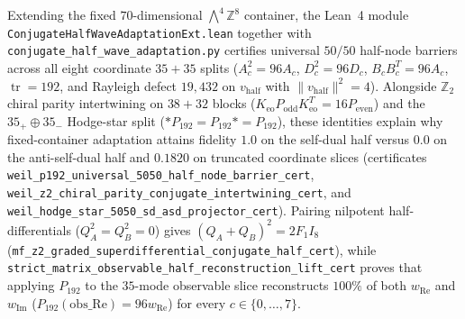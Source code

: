 \documentclass[11pt,a4paper]{article}
\begin{document}
Extending the fixed $70$-dimensional $\bigwedge^4 \mathbb{Z}^8$ container, the Lean~4 module {\small\texttt{Conjugate\allowbreak{}Half\allowbreak{}Wave\allowbreak{}Adaptation\allowbreak{}Ext.lean}} together with {\small\texttt{conjugate\_\allowbreak{}half\_\allowbreak{}wave\_\allowbreak{}adaptation.py}} certifies universal $50/50$ half-node barriers across all eight coordinate $35{+}35$ splits ($A_c^2 = 96 A_c$, $D_c^2 = 96 D_c$, $B_c B_c^T = 96 A_c$, $\operatorname{tr} = 192$, and Rayleigh defect $19{,}432$ on $v_{\mathrm{half}}$ with $\|v_{\mathrm{half}}\|^2 = 4$). Alongside $\mathbb{Z}_2$ chiral parity intertwining on $38{+}32$ blocks ($K_{\mathrm{eo}} P_{\mathrm{odd}} K_{\mathrm{eo}}^T = 16 P_{\mathrm{even}}$) and the $35_+ \oplus 35_-$ Hodge-star split ($* P_{192} = P_{192} * = P_{192}$), these identities explain why fixed-container adaptation attains fidelity $1.0$ on the self-dual half versus $0.0$ on the anti-self-dual half and $0.1820$ on truncated coordinate slices (certificates {\small\texttt{weil\_\allowbreak{}p192\_\allowbreak{}universal\_\allowbreak{}5050\_\allowbreak{}half\_\allowbreak{}node\_\allowbreak{}barrier\_\allowbreak{}cert}}, {\small\texttt{weil\_\allowbreak{}z2\_\allowbreak{}chiral\_\allowbreak{}parity\_\allowbreak{}conjugate\_\allowbreak{}intertwining\_\allowbreak{}cert}}, and {\small\texttt{weil\_\allowbreak{}hodge\_\allowbreak{}star\_\allowbreak{}5050\_\allowbreak{}sd\_\allowbreak{}asd\_\allowbreak{}projector\_\allowbreak{}cert}}). Pairing nilpotent half-differentials ($Q_A^2 = Q_B^2 = 0$) gives $(Q_A + Q_B)^2 = 2 F_1 I_8$ ({\small\texttt{mf\_\allowbreak{}z2\_\allowbreak{}graded\_\allowbreak{}superdifferential\_\allowbreak{}conjugate\_\allowbreak{}half\_\allowbreak{}cert}}), while {\small\texttt{strict\_\allowbreak{}matrix\_\allowbreak{}observable\_\allowbreak{}half\_\allowbreak{}reconstruction\_\allowbreak{}lift\_\allowbreak{}cert}} proves that applying $P_{192}$ to the $35$-mode observable slice reconstructs $100\%$ of both $w_{\mathrm{Re}}$ and $w_{\mathrm{Im}}$ ($P_{192}(\mathrm{obs\_Re}) = 96 w_{\mathrm{Re}}$) for every $c \in \{0,\dots,7\}$.
\end{document}
